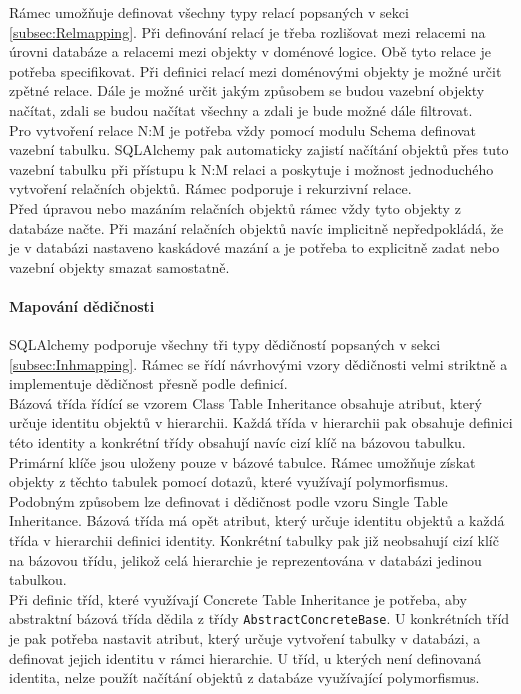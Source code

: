 \documentclass[ing,male,java,dept456]{diploma}						%
\begin{document}
Rámec umožňuje definovat všechny typy relací popsaných v sekci \ref{subsec:Relmapping}. Při definování relací je třeba rozlišovat mezi relacemi na úrovni databáze a relacemi mezi objekty v doménové logice. Obě tyto relace je potřeba specifikovat. Při definici relací mezi doménovými objekty je možné určit zpětné relace. Dále je možné určit jakým způsobem se budou vazební objekty načítat, zdali se budou načítat všechny a zdali je bude možné dále filtrovat. \\
Pro vytvoření relace N:M je potřeba vždy pomocí modulu Schema definovat vazební tabulku. SQLAlchemy pak automaticky zajistí načítání objektů přes tuto vazební tabulku při přístupu k N:M relaci a poskytuje i možnost jednoduchého vytvoření relačních objektů. Rámec podporuje i rekurzivní relace. \\
Před úpravou nebo mazáním relačních objektů rámec vždy tyto objekty z databáze načte. Při mazání relačních objektů navíc implicitně nepředpokládá, že je v databázi nastaveno kaskádové mazání a je potřeba to explicitně zadat nebo vazební objekty smazat samostatně.

\paragraph{Mapování dědičnosti}

SQLAlchemy podporuje všechny tři typy dědičností popsaných v sekci \ref{subsec:Inhmapping}. Rámec se řídí návrhovými vzory dědičnosti velmi striktně a implementuje dědičnost přesně podle definicí. \\
Bázová třída řídící se vzorem Class Table Inheritance obsahuje atribut, který určuje identitu objektů v hierarchii. Každá třída v hierarchii pak obsahuje definici této identity a konkrétní třídy obsahují navíc cizí klíč na bázovou tabulku. Primární klíče jsou uloženy pouze v bázové tabulce. Rámec umožňuje získat objekty z těchto tabulek pomocí dotazů, které využívají polymorfismus. \\
Podobným způsobem lze definovat i dědičnost podle vzoru Single Table Inheritance. Bázová třída má opět atribut, který určuje identitu objektů a každá třída v hierarchii definici identity. Konkrétní tabulky pak již neobsahují cizí klíč na bázovou třídu, jelikož celá hierarchie je reprezentována v databázi jedinou tabulkou. \\
Při definic tříd, které využívají Concrete Table Inheritance je potřeba, aby abstraktní bázová třída dědila z třídy \lstinline[style=inlinepython]|AbstractConcreteBase|. U konkrétních tříd je pak potřeba nastavit atribut, který určuje vytvoření tabulky v databázi, a definovat jejich identitu v rámci hierarchie. U tříd, u kterých není definovaná identita, nelze použít načítání objektů z databáze využívající polymorfismus.
\end{document}

